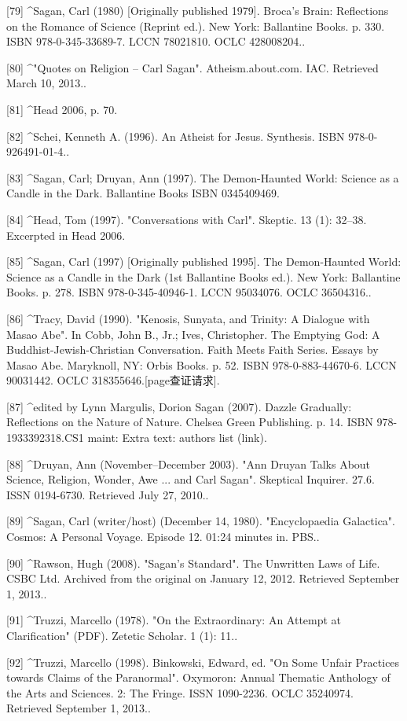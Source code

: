 [79]
^Sagan, Carl (1980) [Originally published 1979]. Broca's Brain: Reflections on the Romance of Science (Reprint ed.). New York: Ballantine Books. p. 330. ISBN 978-0-345-33689-7. LCCN 78021810. OCLC 428008204..

[80]
^"Quotes on Religion – Carl Sagan". Atheism.about.com. IAC. Retrieved March 10, 2013..

[81]
^Head 2006, p. 70.

[82]
^Schei, Kenneth A. (1996). An Atheist for Jesus. Synthesis. ISBN 978-0-926491-01-4..

[83]
^Sagan, Carl; Druyan, Ann (1997). The Demon-Haunted World: Science as a Candle in the Dark. Ballantine Books ISBN 0345409469.

[84]
^Head, Tom (1997). "Conversations with Carl". Skeptic. 13 (1): 32–38. Excerpted in Head 2006.

[85]
^Sagan, Carl (1997) [Originally published 1995]. The Demon-Haunted World: Science as a Candle in the Dark (1st Ballantine Books ed.). New York: Ballantine Books. p. 278. ISBN 978-0-345-40946-1. LCCN 95034076. OCLC 36504316..

[86]
^Tracy, David (1990). "Kenosis, Sunyata, and Trinity: A Dialogue with Masao Abe". In Cobb, John B., Jr.; Ives, Christopher. The Emptying God: A Buddhist-Jewish-Christian Conversation. Faith Meets Faith Series. Essays by Masao Abe. Maryknoll, NY: Orbis Books. p. 52. ISBN 978-0-883-44670-6. LCCN 90031442. OCLC 318355646.[page查证请求].

[87]
^edited by Lynn Margulis, Dorion Sagan (2007). Dazzle Gradually: Reflections on the Nature of Nature. Chelsea Green Publishing. p. 14. ISBN 978-1933392318.CS1 maint: Extra text: authors list (link).

[88]
^Druyan, Ann (November–December 2003). "Ann Druyan Talks About Science, Religion, Wonder, Awe ... and Carl Sagan". Skeptical Inquirer. 27.6. ISSN 0194-6730. Retrieved July 27, 2010..

[89]
^Sagan, Carl (writer/host) (December 14, 1980). "Encyclopaedia Galactica". Cosmos: A Personal Voyage. Episode 12. 01:24 minutes in. PBS..

[90]
^Rawson, Hugh (2008). "Sagan's Standard". The Unwritten Laws of Life. CSBC Ltd. Archived from the original on January 12, 2012. Retrieved September 1, 2013..

[91]
^Truzzi, Marcello (1978). "On the Extraordinary: An Attempt at Clarification" (PDF). Zetetic Scholar. 1 (1): 11..

[92]
^Truzzi, Marcello (1998). Binkowski, Edward, ed. "On Some Unfair Practices towards Claims of the Paranormal". Oxymoron: Annual Thematic Anthology of the Arts and Sciences. 2: The Fringe. ISSN 1090-2236. OCLC 35240974. Retrieved September 1, 2013..

